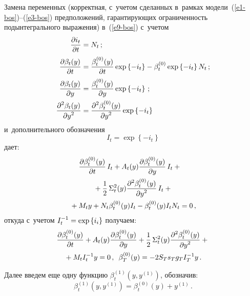 \begin{multicols}{2}
     
     Замена переменных (корректная, с~учетом сделанных в~рамках 
модели~(\ref{e1-bos})--(\ref{e3-bos}) предположений, гарантирующих 
ограниченность подынтегрального выражения) в~(\ref{e9-bos}) с~учетом 
\begin{align*}
     \displaystyle\frac{\displaystyle \partial i_t\mathstrut}{\displaystyle \partial t\mathstrut}&=N_t\,;
     \\
     \displaystyle\frac{\displaystyle \partial \beta_t(y)\mathstrut}{\displaystyle \partial t\mathstrut}&=\displaystyle\frac{\displaystyle \beta_t^{(0)}(y)\mathstrut}{\displaystyle \partial t\mathstrut} 
     \exp \left\{ 
-i_t\right\}-\beta_t^{(0)}\exp \left\{ -i_t\right\} N_t\,;
    \\
     \displaystyle\frac{\displaystyle \partial \beta_t(y)\mathstrut}{\displaystyle \partial y\mathstrut}&=\displaystyle\frac{\displaystyle \beta_t^{(0)}(y)\mathstrut}{\displaystyle \partial y\mathstrut}\exp 
\left\{-i_t\right\}\,;
     \\
     \displaystyle\frac{\displaystyle \partial^2 \beta_t(y)\mathstrut}{\displaystyle \partial 
y^2\mathstrut}&=\displaystyle\frac{\displaystyle \partial^2\beta_t^{(0)}(y)\mathstrut}{\displaystyle \partial y^2\mathstrut}\exp \left\{ -i_t\right\}
    \end{align*}
     и~дополнительного обозначения 
     $$
     I_t=\exp \left\{ -i_t\right\}
     $$ 
     дает:
     \begin{multline*}
    \hspace*{-8pt} \displaystyle\frac{\displaystyle \partial \beta_t^{(0)}(y)\mathstrut}{\displaystyle \partial t\mathstrut}\,I_t +A_t(y) \displaystyle\frac{\displaystyle \partial 
\beta_t^{(0)}(y)\mathstrut}{\displaystyle \partial y\mathstrut}\,I_t +{}\\
{}+\displaystyle\frac{\displaystyle 1\mathstrut}{\displaystyle 2\mathstrut}\,\Sigma_t^2(y)\displaystyle\frac{\displaystyle \partial^2 
\beta_t^{(0)}(y)\mathstrut}{\displaystyle \partial y^2\mathstrut}\,I_t +{}\\
{}+M_t y+N_t\beta_t^{(0)}(y) I_t-\beta_t^{(0)} 
(y) I_tN_t=0\,,
     \end{multline*}
откуда с~учетом $I_t^{-1}\hm= \exp \left\{i_i\right\}$ получаем:
\begin{multline}
\fr{\partial \beta_t^{(0)}(y)}{\partial t}+A_t(y)\fr{\partial 
\beta_t^{(0)}(y)}{\partial y} 
+\fr{1}{2}\,\Sigma_t^2(y)\fr{\partial^2\beta_t^{(0)}(y)}{\partial y^2}+{}\\
{}+M_t I_t^{-1} y=0\,,
\enskip
\beta_T^{(0)}(y)=-2S_T s_T g_T I_T^{-1}y\,.
\label{e11-bos}
\end{multline}

     Далее введем еще одну функцию $\beta_t^{(1)}\left(y,y^{(1)}\right)$, 
обозначив:
     \begin{equation}
     \beta_t^{(1)}\left(y, y^{(1)}\right) =\beta_t^{(0)}(y)+y^{(1)}\,.
     \label{e12-bos}
     \end{equation}
     

\end{multicols}
